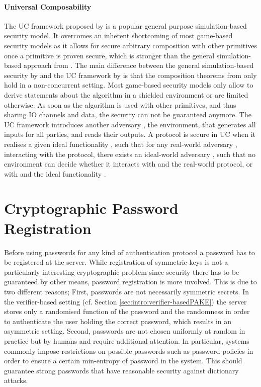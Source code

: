 \paragraph{Universal Composability} \label{sec:uc-intro}
The \ac{UC} framework proposed by \citet{Canetti2001a} is a popular general purpose simulation-based security model.
It overcomes an inherent shortcoming of most game-based security models as it allows for secure arbitrary composition with other primitives once a primitive is proven secure, which is stronger than the general simulation-based approach from \citet{Canetti00}.
The main difference between the general simulation-based security by \citet{Canetti00} and the \ac{UC} framework by \citet{Canetti2001a} is that the composition theorems from \citet{Canetti00} only hold in a non-concurrent setting.
Most game-based security models only allow to derive statements about the algorithm in a shielded environment or are limited otherwise.
As soon as the algorithm is used with other primitives, and thus sharing \ac{IO} channels and data, the security can not be guaranteed anymore.
The \ac{UC} framework introduces another adversary \UCZ, the environment, that generates all inputs for all parties, and reads their outputs.
A protocol is secure in \ac{UC} when it realises a given ideal functionality \UCF, such that for any real-world adversary \A, interacting with the protocol, there exists an ideal-world adversary \UCS, such that no environment \UCZ can decide whether it interacts with \A and the real-world protocol, or with \UCS and the ideal functionality \UCF.



\section{Cryptographic Password Registration}\label{sec:intro:registration}
Before using passwords for any kind of authentication protocol a password has to be registered at the server.
While registration of symmetric keys is not a particularly interesting cryptographic problem since security there has to be guaranteed by other means, password registration is more involved.
This is due to two different reasons;
First, passwords are not necessarily symmetric secrets.
In the verifier-based setting (cf. Section \ref{sec:intro:verifier-basedPAKE}) the server stores only a randomised function of the password and the randomness in order to authenticate the user holding the correct password, which results in an asymmetric setting.
Second, passwords are not chosen uniformly at random in practice but by humans and require additional attention.
In particular, systems commonly impose restrictions on possible passwords such as password policies in order to ensure a certain min-entropy of password in the system.
This should guarantee strong passwords that have reasonable security against dictionary attacks.


